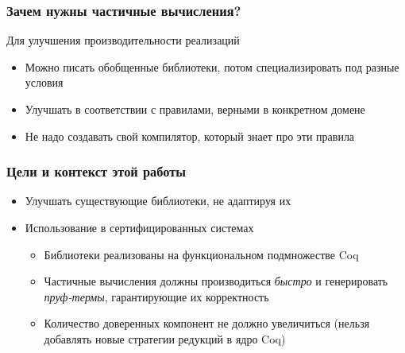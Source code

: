 \documentclass[xcolor=table]{beamer}
\begin{document}
\begin{frame}[fragile]
  \transwipe[direction=90]
  \frametitle{Зачем нужны частичные вычисления?}
\begin{center}
  Для улучшения производительности реализаций
\end{center}
\begin{itemize}
  \item Можно писать обобщенные библиотеки, потом специализировать под разные условия
  \item Улучшать в соответствии с правилами, верными в конкретном домене
  \item Не надо создавать свой компилятор, который знает про эти правила
\end{itemize}
\end{frame}


\begin{frame}[fragile]
  \transwipe[direction=90]
  \frametitle{Цели и контекст этой работы}
\begin{itemize}
  \item Улучшать существующие библиотеки, не адаптируя их
  \item Использование в сертифицированных системах
  \begin{itemize}
    \item Библиотеки реализованы на функциональном подмножестве Coq
    \item Частичные вычисления должны производиться \emph{быстро} и генерировать \emph{пруф-термы}, гарантирующие их корректность
    \item Количество доверенных компонент не должно увеличиться (нельзя добавлять новые стратегии редукций в ядро Coq)
  \end{itemize}
\end{itemize}
\end{frame}
\end{document}
